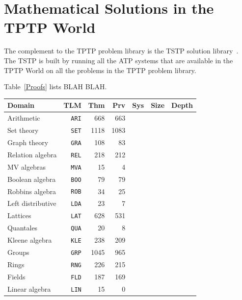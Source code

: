 \documentclass[runningheads]{llncs}
\begin{document}
\section{Mathematical Solutions in the TPTP World}
\label{TSTP}

The complement to the TPTP problem library is the TSTP solution library~\cite{Sut07-CSR,Sut10}.
The TSTP is built by running all the ATP systems that are available in the TPTP World on
all the problems in the TPTP problem library.

Table~\ref{Proofs} lists BLAH BLAH.

\begin{table}[htb]
\begin{center}
\setlength{\tabcolsep}{4pt}
\begin{tabular}{lr|rrrrr}
Domain              & TLM       & Thm  & Prv  & Sys & Size & Depth \\
\hline
Arithmetic          & {\tt ARI} &  668 &  663 &     &      &       \\
Set theory          & {\tt SET} & 1118 & 1083 &     &      &       \\
Graph theory        & {\tt GRA} &  108 &   83 &     &      &       \\
Relation algebra    & {\tt REL} &  218 &  212 &     &      &       \\
MV algebras         & {\tt MVA} &   15 &    4 &     &      &       \\
Boolean algebra     & {\tt BOO} &   79 &   79 &     &      &       \\
Robbins algebra     & {\tt ROB} &   34 &   25 &     &      &       \\
Left distributive   & {\tt LDA} &   23 &    7 &     &      &       \\
Lattices            & {\tt LAT} &  628 &  531 &     &      &       \\
Quantales           & {\tt QUA} &   20 &    8 &     &      &       \\
Kleene algebra      & {\tt KLE} &  238 &  209 &     &      &       \\
Groups              & {\tt GRP} & 1045 &  965 &     &      &       \\
Rings               & {\tt RNG} &  226 &  215 &     &      &       \\
Fields              & {\tt FLD} &  187 &  169 &     &      &       \\
Linear algebra      & {\tt LIN} &   15 &    0 &     &      &       \\

\end{tabular}
\end{center}
\end{table}
\end{document}
